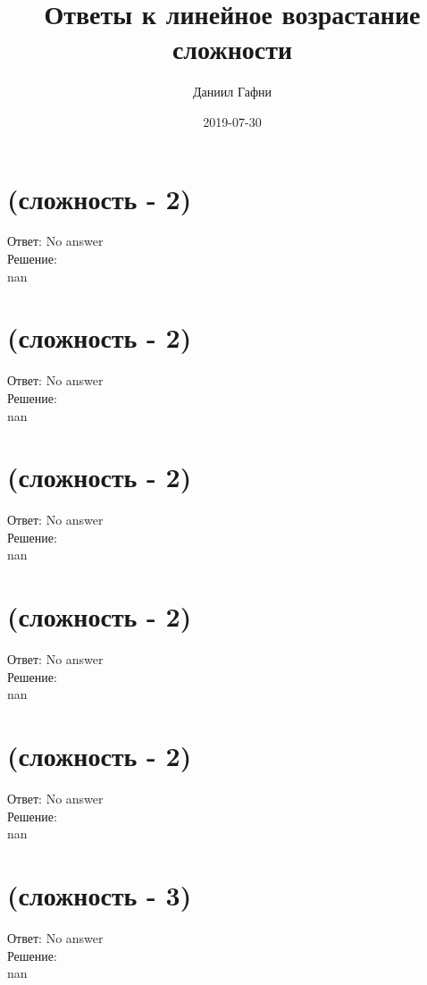 \documentclass{article}%
\title{Ответы к линейное возрастание сложности}%
\author{Даниил Гафни}%
\date{2019{-}07{-}30}%
\begin{document}
%
\normalsize%
\maketitle%
\section{(сложность {-} 2)}%
\label{sec:( {-} 2)}%
\hspace{3ex} Ответ: No answer \\%
%
\hspace*{3ex} Решение: \\%
nan

%
\section{(сложность {-} 2)}%
\label{sec:( {-} 2)}%
\hspace{3ex} Ответ: No answer \\%
%
\hspace*{3ex} Решение: \\%
nan

%
\section{(сложность {-} 2)}%
\label{sec:( {-} 2)}%
\hspace{3ex} Ответ: No answer \\%
%
\hspace*{3ex} Решение: \\%
nan

%
\section{(сложность {-} 2)}%
\label{sec:( {-} 2)}%
\hspace{3ex} Ответ: No answer \\%
%
\hspace*{3ex} Решение: \\%
nan

%
\section{(сложность {-} 2)}%
\label{sec:( {-} 2)}%
\hspace{3ex} Ответ: No answer \\%
%
\hspace*{3ex} Решение: \\%
nan

%
\section{(сложность {-} 3)}%
\label{sec:( {-} 3)}%
\hspace{3ex} Ответ: No answer \\%
%
\hspace*{3ex} Решение: \\%
nan
\end{document}
